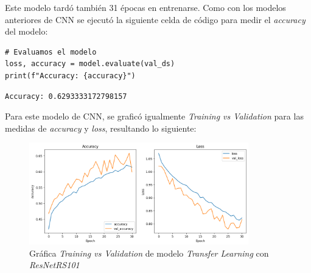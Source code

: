 Este modelo tardó también 31 épocas en entrenarse. Como con los modelos anteriores de CNN se ejecutó la siguiente celda de código para medir el \textit{accuracy} del modelo:


\begin{lstlisting}[caption={Código para la impresión del \textit{accuracy} del modelo}]
# Evaluamos el modelo
loss, accuracy = model.evaluate(val_ds)
print(f"Accuracy: {accuracy}")
\end{lstlisting}


\begin{lstlisting}[caption={Impresión \textit{accuracy} del modelo}]
Accuracy: 0.6293333172798157
\end{lstlisting}

\newpage

Para este modelo de CNN, se graficó igualmente \textit{Training vs Validation} para las medidas de \textit{accuracy} y \textit{loss}, resultando lo siguiente: 

\begin{figure}[H]
    \centering
    \includegraphics[width=0.85\textwidth]{Francisco/Imagenes resultados/TvsVCNN3.png} 
    \caption{Gráfica \textit{Training vs Validation} de modelo \textit{Transfer Learning} con \textit{ResNetRS101}}
\end{figure}

